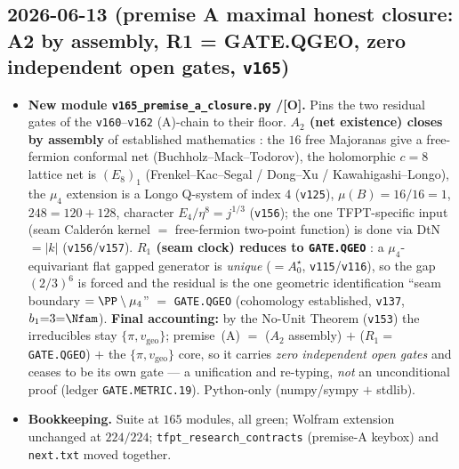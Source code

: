 \documentclass[11pt]{article}
\providecommand{\mO}{\textbf{[O]}}\providecommand{\mX}{\textbf{[X]}}
\providecommand{\vref}[1]{\texttt{#1}}
\begin{document}
\subsection*{2026-06-13 (premise A maximal honest closure: A2 by assembly, R1 = GATE.QGEO, zero independent open gates, \vref{v165})}
\begin{itemize}
\item \textbf{New module \texttt{v165\_premise\_a\_closure.py} \mC/\mO.} Pins the two residual gates of the
  \vref{v160}--\vref{v162} (A)-chain to their floor. \textbf{$A_2$ (net existence) closes by assembly} of
  established mathematics \mC: the $16$ free Majoranas give a free-fermion conformal net
  (Buchholz--Mack--Todorov), the holomorphic $c{=}8$ lattice net is $(E_8)_1$ (Frenkel--Kac--Segal /
  Dong--Xu / Kawahigashi--Longo), the $\mu_4$ extension is a Longo Q-system of index $4$ (\vref{v125}),
  $\mu(B){=}16/16{=}1$, $248{=}120{+}128$, character $E_4/\eta^8{=}j^{1/3}$ (\vref{v156}); the one
  TFPT-specific input (seam Calder\'on kernel $=$ free-fermion two-point function) is done via DtN $=|k|$
  (\vref{v156}/\vref{v157}). \textbf{$R_1$ (seam clock) reduces to \texttt{GATE.QGEO}} \mC: a
  $\mu_4$-equivariant flat gapped generator is \emph{unique} ($=A_0^\star$, \vref{v115}/\vref{v116}), so the
  gap $(2/3)^6$ is forced and the residual is the one geometric identification ``seam boundary $=
  \PP\setminus\mu_4$'' $=$ \texttt{GATE.QGEO} (cohomology established, \vref{v137}, $b_1{=}3{=}\Nfam$).
  \textbf{Final accounting:} by the No-Unit Theorem (\vref{v153}) the irreducibles stay $\{\pi,
  v_{\mathrm{geo}}\}$; premise~(A) $=$ ($A_2$ assembly) $+$ ($R_1{=}$\texttt{GATE.QGEO}) $+$ the
  $\{\pi,v_{\mathrm{geo}}\}$ core, so it carries \emph{zero independent open gates} and ceases to be its own
  gate --- a unification and re-typing, \emph{not} an unconditional proof (ledger \texttt{GATE.METRIC.19}).
  Python-only (numpy/sympy $+$ stdlib).
\item \textbf{Bookkeeping.} Suite at $165$ modules, all green; Wolfram extension unchanged at $224/224$;
  \texttt{tfpt\_research\_contracts} (premise-A keybox) and \texttt{next.txt} moved together.
\end{itemize}
\end{document}

